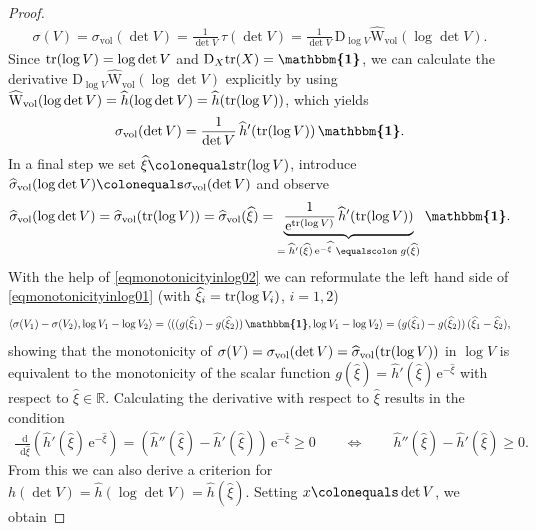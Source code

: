 \documentclass[10pt]{article}
\numberwithin{theoremCounter}{section}
\theoremstyle{plain}
\theoremstyle{definition}
\newcommand{\id}{{\boldsymbol{\mathbbm{1}}}}
\newcommand{\R}{\mathbb{R}}
\newcommand{\DD}{\mathrm{D}}
\newcommand{\WW}{\mathrm{W}}
\newcommand*\dif{\mathop{}\!\mathrm{d}}
\DeclareMathOperator{\tr}{tr}
\DeclareMathOperator{\vol}{vol}
\def\tr{\textnormal{tr}}
\numberwithin{equation}{section}
\begin{document}
\begin{appendix}
\begin{proof}
	\begin{align}
	\sigma(V) = \sigma_{\vol}(\det V) = \frac{1}{\det V} \, \tau(\det V) = \frac{1}{\det V} \, \DD_{\log V} \widehat{\WW}_{\vol}(\log \det V).
	\end{align}
Since $\tr(\log V) = \log \det V$ and $\DD_X \tr(X) = \id$, we can calculate the derivative $\DD_{\log V} \widehat{\WW}_{\vol}(\log \det V)$ explicitly by using $\widehat{\WW}_{\vol}(\log \det V) = \widehat{h}(\log \det V) = \widehat{h}(\tr(\log V))$, which yields
	\begin{align}
	\sigma_{\vol}(\det V) = \frac{1}{\det V} \, \widehat{h}'(\tr(\log V)) \, \id.
	\end{align}
In a final step we set $\widehat{\xi} \colonequals \tr(\log V)$, introduce $\widehat{\sigma}_{\vol}(\log \det V)\colonequals \sigma_{\vol}(\det V)$ and observe
	\begin{align}
	\label{eqmonotonicityinlog02}
	\widehat{\sigma}_{\vol}(\log \det V) = \widehat{\sigma}_{\vol}(\tr(\log V)) = \widehat{\sigma}_{\vol}(\widehat{\xi}) = \underbrace{\frac{1}{\mathrm{e}^{\tr(\log V)}} \, \widehat{h}'(\tr(\log V))}_{= \; \widehat{h}'(\widehat{\xi}) \, \mathrm{e}^{-\widehat{\xi}} \; \equalscolon \; g(\widehat \xi)} \, \id.
	\end{align}
With the help of \eqref{eqmonotonicityinlog02} we can reformulate the left hand side of \eqref{eqmonotonicityinlog01} (with $\widehat \xi_i = \tr(\log V_i)$, $i = 1, 2$)
	\begin{align}
	\langle \sigma(V_1) - \sigma(V_2), \log V_1 - \log V_2 \rangle = \langle ((g(\widehat \xi_1) - g(\widehat \xi_2)) \, \id, \log V_1 - \log V_2 \rangle = (g(\widehat \xi_1) - g(\widehat \xi_2)) \, (\widehat \xi_1 - \widehat \xi_2),
	\end{align}
showing that the monotonicity of $\sigma(V) = \sigma_{\vol}(\det V) = \widehat{\sigma}_{\vol}(\tr(\log V))$ in $\log V$ is equivalent to the monotonicity of the scalar function $g(\widehat \xi) = \widehat{h}'(\widehat{\xi}) \, \mathrm{e}^{-\widehat{\xi}}$ with respect to $\widehat{\xi} \in \R$. Calculating the derivative with respect to $\widehat{\xi}$ results in the condition
	\begin{align}
	\frac{\dif}{\dif \widehat{\xi}} \left( \widehat{h}'(\widehat{\xi}) \, \mathrm{e}^{-\widehat \xi} \right) = (\widehat h''(\widehat \xi) - \widehat h'(\widehat \xi)) \, \mathrm{e}^{-\widehat \xi} \ge 0 \qquad \iff \qquad \widehat h''(\widehat \xi) - \widehat h'(\widehat \xi) \ge 0.
	\end{align}
From this we can also derive a criterion for $h(\det V) = \widehat h(\log \det V) = \widehat h(\widehat \xi)$. Setting $x \colonequals \det V$, we obtain

\end{proof}
\end{appendix}
\end{document}
